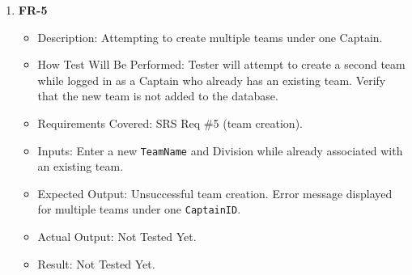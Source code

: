 \documentclass[12pt, titlepage]{article}
\begin{document}
\begin{enumerate}
      \item \textbf{FR-5}  
      \begin{itemize}
          \item Description: Attempting to create multiple teams under one Captain.
          \item How Test Will Be Performed: Tester will attempt to create a second team while logged in as a Captain who already has an existing team. Verify that the new team is not added to the database.
          \item Requirements Covered: SRS Req \#5 (team creation).
          \item Inputs: Enter a new \texttt{TeamName} and Division while already associated with an existing team.
          \item Expected Output: Unsuccessful team creation. Error message displayed for multiple teams under one \texttt{CaptainID}.
          \item Actual Output: Not Tested Yet.
          \item Result: Not Tested Yet.
      \end{itemize}



\end{enumerate}
\end{document}
